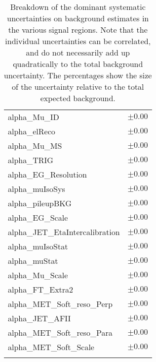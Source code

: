 \begin{table}
\begin{center}
\begin{tabular*}{\textwidth}{@{\extracolsep{\fill}}lc}
alpha\_Mu\_ID         & $\pm 0.00$       \\
alpha\_elReco         & $\pm 0.00$       \\
alpha\_Mu\_MS         & $\pm 0.00$       \\
alpha\_TRIG         & $\pm 0.00$       \\
alpha\_EG\_Resolution         & $\pm 0.00$       \\
alpha\_muIsoSys         & $\pm 0.00$       \\
alpha\_pileupBKG         & $\pm 0.00$       \\
alpha\_EG\_Scale         & $\pm 0.00$       \\
alpha\_JET\_EtaIntercalibration         & $\pm 0.00$       \\
alpha\_muIsoStat         & $\pm 0.00$       \\
alpha\_muStat         & $\pm 0.00$       \\
alpha\_Mu\_Scale         & $\pm 0.00$       \\
alpha\_FT\_Extra2         & $\pm 0.00$       \\
alpha\_MET\_Soft\_reso\_Perp         & $\pm 0.00$       \\
alpha\_JET\_AFII         & $\pm 0.00$       \\
alpha\_MET\_Soft\_reso\_Para         & $\pm 0.00$       \\
alpha\_MET\_Soft\_Scale         & $\pm 0.00$       \\
\noalign{\smallskip}\hline\noalign{\smallskip}
\end{tabular*}
\end{center}
\caption[Breakdown of uncertainty on background estimates]{
Breakdown of the dominant systematic uncertainties on background estimates in the various signal regions.
Note that the individual uncertainties can be correlated, and do not necessarily add up quadratically to 
the total background uncertainty. The percentages show the size of the uncertainty relative to the total expected background.
\label{table.results.bkgestimate.uncertainties.SR_RPV_0b}}
\end{table}
\clearpage
%